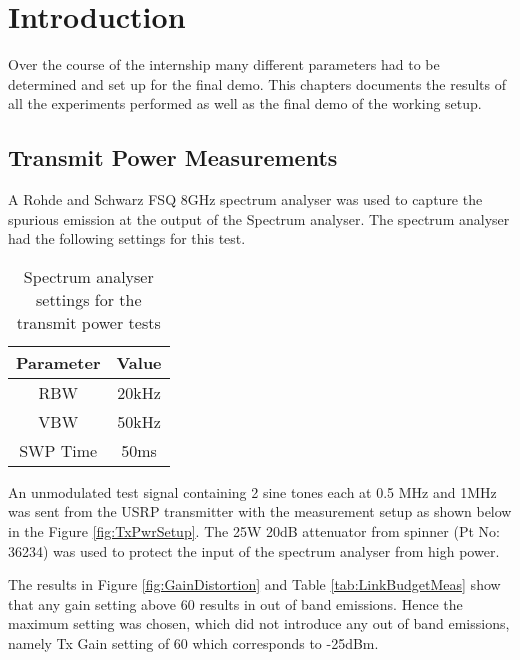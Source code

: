 \chapter{Introduction}
\label{ch:intro}

Over the course of the internship many different parameters had to be determined and set up for the final demo. This chapters documents the results of all the experiments performed as well as the final demo of the working setup.

\section{Transmit Power Measurements}\label{GainDistortion}

A Rohde and Schwarz FSQ 8GHz spectrum analyser was used to capture the spurious emission at the output of the Spectrum analyser. The spectrum analyser had the following settings for this test.

\begin{table}[H]
    \begin{center}
        \begin{tabular}{|c|c|}
            \hline
            Parameter & Value \\ \hline
            RBW & 20kHz \\ \hline
            VBW & 50kHz \\ \hline
            SWP Time & 50ms  \\ 
            \hline
        \end{tabular}
    \end{center}
    \caption{Spectrum analyser settings for the transmit power tests}
    \label{}
\end{table}

An unmodulated test signal containing 2 sine tones each at 0.5 MHz and 1MHz was sent from the USRP transmitter with the measurement setup as shown below in the Figure \ref{fig:TxPwrSetup}. The 25W 20dB attenuator from spinner (Pt No: 36234) was used to protect the input of the spectrum analyser from high power.


The results in Figure \ref{fig:GainDistortion} and Table \ref{tab:LinkBudgetMeas} show that any gain setting above 60 results in out of band emissions. Hence the maximum setting was chosen, which did not introduce any out of band emissions, namely Tx Gain setting of 60 which corresponds to -25dBm.

